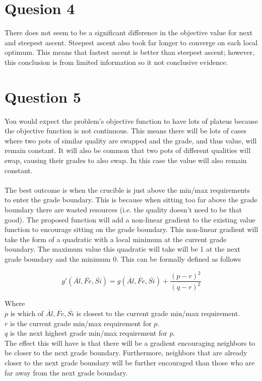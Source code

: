 \documentclass{article}
\begin{document}
\section{Quesion 4}
There does not seem to be a significant difference in the objective
value for next and steepest ascent. Steepest ascent also took far
longer to converge on each local optimum. This means that fastest
ascent is better than steepest ascent; however, this conclusion is from
limited information so it not conclusive evidence.

\section{Question 5}
You would expect the problem's objective function to have lots of 
plateus because the objective function is not continuous. This means
there will be lots of cases where two pots of similar quality are 
swapped and the grade, and thus value, will remain constant. It will 
also be common that two pots of different qualities will swap, causing 
their grades to also swap. In this case the value will also remain
constant.\\\\

The best outcome is when the crucible is just above
the min/max requirements to enter the grade boundary. This is because
when sitting too far above the grade boundary there are wasted
resources (i.e. the quality doesn't need to be that good).
The proposed function will add a non-linear gradient to the existing
value function to encourage sitting on the grade boundary. This 
non-linear gradient will take the form of a quadratic with a local
minimum at the current grade boundary. The maximum value this
quadratic will take will be 1 at the next grade boundary and the 
minimum 0. This can be formally defined as follows

\[
  g'(\overline{Al}, \overline{Fe}, \overline{Si}) = 
  g(\overline{Al}, \overline{Fe}, \overline{Si})
  + \displaystyle\frac{(p-r)^2}{(q-r)^2}
\]

Where\\
$p$ is which of $\overline{Al}, \overline{Fe}, \overline{Si}$ is
closest to the current grade min/max requirement.\\
$r$ is the current grade min/max requirement for $p$.\\
$q$ is the next highest grade min/max requirement for $p$.\\

The effect this will have is that there will be a gradient encouraging
neighbors to be closer to the next grade boundary. Furthermore,
neighbors that are already closer to the next grade boundary will be
further encouraged than those who are far away from the next grade 
boundary. \\
\end{document}
